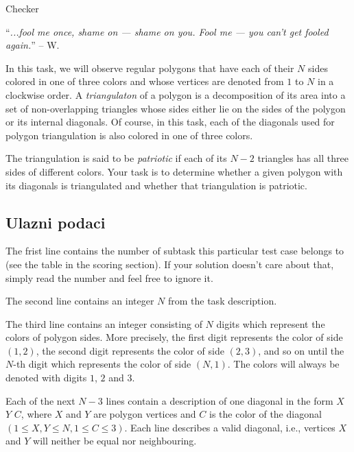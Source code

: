 \begin{statement}[
  problempoints=110,
  timelimit=3 seconds,
  memorylimit=512 MiB,
]{Checker}

``\textit{...fool me once, shame on — shame on you. Fool me — you can't get fooled again.}''
-- W.

In this task, we will observe regular polygons that have each of their $N$ sides
colored in one of three colors and whose vertices are denoted from $1$ to $N$
in a clockwise order. A \textit{triangulaton} of a polygon is a decomposition of
its area into a set of non-overlapping triangles whose sides either lie on the
sides of the polygon or its internal diagonals. Of course, in this task, each of
the diagonals used for polygon triangulation is also colored in one of three
colors.

The triangulation is said to be \textit{patriotic} if each of its $N-2$
triangles has all three sides of different colors. Your task is to determine
whether a given polygon with its diagonals is triangulated and whether that
triangulation is patriotic.

\subsection*{Ulazni podaci}
The frist line contains the number of subtask this particular test case belongs
to (see the table in the scoring section). If your solution doesn't care about
that, simply read the number and feel free to ignore it.

The second line contains an integer $N$ from the task description.

The third line contains an integer consisting of $N$ digits which represent
the colors of polygon sides. More precisely, the first digit represents
the color of side $(1,2)$, the second digit represents the color of side $(2,3)$,
and so on until the $N$-th digit which represents the color of side $(N,1)$. The
colors will always be denoted with digits $1$, $2$ and $3$.

Each of the next $N-3$ lines contain a description of one diagonal in
the form $X$ $Y$ $C$, where $X$ and $Y$ are polygon vertices and
$C$ is the color of the diagonal $(1 \le X, Y \le N, 1 \le C \le 3)$. Each
line describes a valid diagonal, i.e., vertices $X$ and $Y$ will neither
be equal nor neighbouring.


\end{statement}
